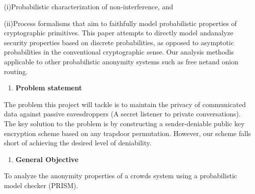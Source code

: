 \documentclass[10pt]{article}
\begin{document}
{\raggedright
(i){\large  }Probabilistic characterization of non-interference, and
}

{\raggedright
(ii){\large  }Process formalisms that aim to faithfully model probabilistic
properties of cryptographic primitives. This paper attempts to directly model
and{\large  }analyze security properties based on discrete probabilities, as
opposed to asymptotic probabilities in the conventional cryptographic sense. Our
analysis method{\large  }is applicable to other probabilistic anonymity systems
such as free net{\large  }and onion routing.
}

\begin{enumerate}
	\item \textbf{{\large Problem statement}}
\end{enumerate}

{\raggedright
{\large The problem this project will tackle is to maintain the privacy of
communicated data against passive eavesdroppers (A secret listener to private
conversations). The key solution to the problem is by constructing a
sender-deniable public key encryption scheme based on any trapdoor permutation.
However, our scheme falls short of achieving the desired level of deniability. }
}
\begin{enumerate}
	\item \textbf{{\large General Objective}}
\end{enumerate}
	{\raggedright
{\large To analyze the anonymity properties of a crowds system using a probabilistic model checker (PRISM). }
}
\end{document}
